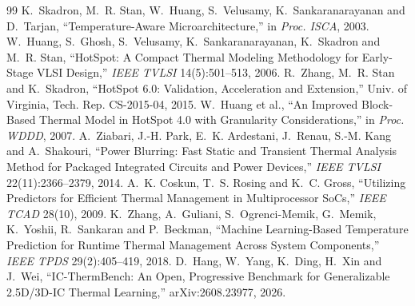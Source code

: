 \documentclass[11pt,a4paper]{article}
\begin{document}
\begin{thebibliography}{99}\small
\setlength{\itemsep}{2pt}
 K.~Skadron, M.~R. Stan, W.~Huang, S.~Velusamy, K.~Sankaranarayanan and
  D.~Tarjan, ``Temperature-Aware Microarchitecture,'' in \emph{Proc. ISCA}, 2003.
 W.~Huang, S.~Ghosh, S.~Velusamy, K.~Sankaranarayanan, K.~Skadron and
  M.~R. Stan, ``HotSpot: A Compact Thermal Modeling Methodology for Early-Stage VLSI Design,''
  \emph{IEEE TVLSI} 14(5):501--513, 2006.
 R.~Zhang, M.~R. Stan and K.~Skadron, ``HotSpot 6.0: Validation, Acceleration
  and Extension,'' Univ. of Virginia, Tech. Rep. CS-2015-04, 2015.
 W.~Huang et al., ``An Improved Block-Based Thermal Model in HotSpot 4.0 with
  Granularity Considerations,'' in \emph{Proc. WDDD}, 2007.
 A.~Ziabari, J.-H. Park, E.~K. Ardestani, J.~Renau, S.-M. Kang and
  A.~Shakouri, ``Power Blurring: Fast Static and Transient Thermal Analysis Method for Packaged
  Integrated Circuits and Power Devices,'' \emph{IEEE TVLSI} 22(11):2366--2379, 2014.
 A.~K. Coskun, T.~S. Rosing and K.~C. Gross, ``Utilizing Predictors for
  Efficient Thermal Management in Multiprocessor SoCs,'' \emph{IEEE TCAD} 28(10), 2009.
 K.~Zhang, A.~Guliani, S.~Ogrenci-Memik, G.~Memik, K.~Yoshii, R.~Sankaran and
  P.~Beckman, ``Machine Learning-Based Temperature Prediction for Runtime Thermal Management
  Across System Components,'' \emph{IEEE TPDS} 29(2):405--419, 2018.
 D.~Hang, W.~Yang, K.~Ding, H.~Xin and J.~Wei, ``IC-ThermBench: An Open,
  Progressive Benchmark for Generalizable 2.5D/3D-IC Thermal Learning,'' arXiv:2608.23977, 2026.
\end{thebibliography}
\end{document}

